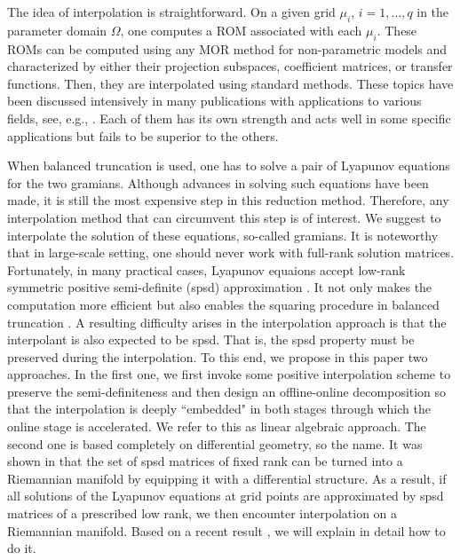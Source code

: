 The idea of interpolation is straightforward. On a given grid $\mu_i$, $i = 1, \dots, q$ in the parameter domain $\Omega$, one computes a ROM associated with each $\mu_i$. These ROMs can be computed using any MOR method for non-parametric models \cite{Anto05} and characterized by either their  projection subspaces, coefficient matrices, or transfer functions. Then, they are interpolated using standard methods. These topics have been discussed intensively in many publications with applications to various fields, see, e.g., \cite{AmsaF08,BaurB09,PanzMEL10,DegrVW10,AmsaF11,Son12,SonS15}. Each of them has its own strength and acts well in some specific applications but fails to be superior to the others. 

When balanced truncation \cite{Moor81} is used,  one has to solve a pair of Lyapunov equations for the two gramians. Although advances in solving such equations have been made, it is still the most expensive step in this reduction method. Therefore, any interpolation method that can circumvent this step is of interest. We suggest to interpolate the solution of these equations, so-called gramians. It is noteworthy that in large-scale setting, one should never work with full-rank solution matrices. Fortunately, in many practical cases, Lyapunov equaions accept low-rank symmetric positive semi-definite (spsd) approximation \cite{Penz00b,AntoSZ02}. It not only makes the computation more efficient but also enables the squaring procedure in balanced truncation \cite{TombP87}. A resulting difficulty arises in the interpolation approach is that the interpolant is also expected to be spsd. That is, the spsd property must be preserved during the interpolation. To this end, we propose in this paper two approaches. In the first one, we first invoke some positive interpolation scheme to preserve the semi-definiteness and then %
design an offline-online decomposition so that the interpolation is deeply ``embedded" in both stages through which the online stage is accelerated. We refer to this as linear algebraic approach. The second one is based completely on differential geometry, so the name. It was shown in \cite{VandAV09,MassA18} that the set of spsd matrices of fixed rank can be turned into a Riemannian manifold by equipping it with a differential structure. As a result, if all solutions of the Lyapunov equations at grid points are approximated by spsd matrices of a prescribed low rank, we then encounter interpolation on a Riemannian manifold. Based on a recent result \cite{MassA18}, we will explain in detail how to do it.

